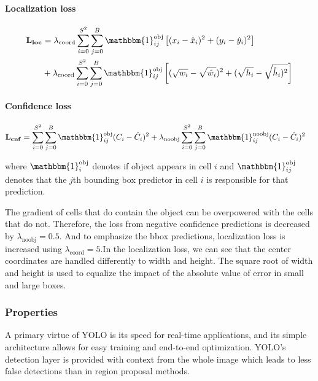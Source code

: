 \paragraph{Localization loss}
\begin{align*}
\mathbf{L_{loc}} &= \lambda_{\text{coord}} \sum_{i=0}^{S^2} \sum_{j=0}^B \mathbbm{1}_{ij}^{\text{obj}} \left[(x_i - \hat{x}_i)^2 + (y_i - \hat{y}_i)^2\right] \\
 &+  \lambda_{\text{coord}} \sum_{i=0}^{S^2} \sum_{j=0}^B \mathbbm{1}_{ij}^{\text{obj}} \left[(\sqrt{w_i} - \sqrt{\hat{w}_i})^2 + (\sqrt{h_i} - \sqrt{\hat{h}_i)^2}\right]
\end{align*}

\paragraph{Confidence loss}
\begin{align*}
\mathbf{L_{cnf}} &= \sum_{i=0}^{S^2} \sum_{j=0}^B \mathbbm{1}_{ij}^{\text{obj}} (C_i - \hat{C}_i)^2 
+ \lambda_{\text{noobj}} \sum_{i=0}^{S^2} \sum_{j=0}^B \mathbbm{1}_{ij}^{\text{noobj}} (C_i - \hat{C}_i)^2
\end{align*}

\noindent where $\mathbbm{1}^{\text{obj}}_i$ denotes if object appears in cell $i$ and $\mathbbm{1}^{\text{obj}}_{ij}$ denotes that the $j$th bounding box predictor in cell $i$ is responsible for that prediction.

The gradient of cells that do contain the object can be overpowered with the cells that do not.  Therefore, the loss from negative confidence predictions is decreased by $\lambda_{\text{noobj}} = 0.5$. And to emphasize the bbox predictions, localization loss is increased using $\lambda_{\text{coord}} = 5$.In the localization loss, we can see that the center coordinates are handled differently to width and height. The square root of width and height is used to equalize the impact of the absolute value of error in small and large boxes.


\subsubsection{Properties}
A primary virtue of YOLO is its speed for real-time applications, and its simple architecture allows for easy training and end-to-end optimization. YOLO's detection layer is provided with context from the whole image which leads to less false detections than in region proposal methods. 

